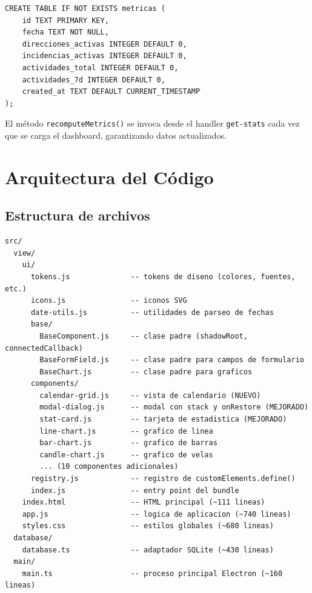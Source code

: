 \documentclass[12pt,a4paper]{article}
\begin{document}
\begin{lstlisting}[caption={Esquema de tabla metricas}, label=lst:db-metrics]
CREATE TABLE IF NOT EXISTS metricas (
    id TEXT PRIMARY KEY,
    fecha TEXT NOT NULL,
    direcciones_activas INTEGER DEFAULT 0,
    incidencias_activas INTEGER DEFAULT 0,
    actividades_total INTEGER DEFAULT 0,
    actividades_7d INTEGER DEFAULT 0,
    created_at TEXT DEFAULT CURRENT_TIMESTAMP
);
\end{lstlisting}

El método \texttt{recomputeMetrics()} se invoca desde el handler \texttt{get-stats} cada vez que se carga el dashboard, garantizando datos actualizados.

\section{Arquitectura del Código}

\subsection{Estructura de archivos}

\begin{verbatim}
src/
  view/
    ui/
      tokens.js              -- tokens de diseno (colores, fuentes, etc.)
      icons.js               -- iconos SVG
      date-utils.js          -- utilidades de parseo de fechas
      base/
        BaseComponent.js     -- clase padre (shadowRoot, connectedCallback)
        BaseFormField.js     -- clase padre para campos de formulario
        BaseChart.js         -- clase padre para graficos
      components/
        calendar-grid.js     -- vista de calendario (NUEVO)
        modal-dialog.js      -- modal con stack y onRestore (MEJORADO)
        stat-card.js         -- tarjeta de estadistica (MEJORADO)
        line-chart.js        -- grafico de linea
        bar-chart.js         -- grafico de barras
        candle-chart.js      -- grafico de velas
        ... (10 componentes adicionales)
      registry.js            -- registro de customElements.define()
      index.js               -- entry point del bundle
    index.html               -- HTML principal (~111 lineas)
    app.js                   -- logica de aplicacion (~740 lineas)
    styles.css               -- estilos globales (~680 lineas)
  database/
    database.ts              -- adaptador SQLite (~430 lineas)
  main/
    main.ts                  -- proceso principal Electron (~160 lineas)
\end{verbatim}
\end{document}
